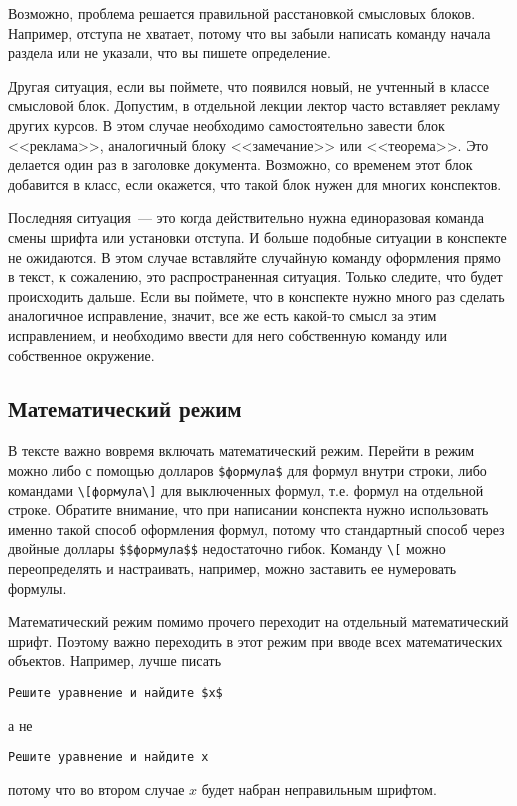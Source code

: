 \documentclass{article}
\begin{document}
    Возможно, проблема решается правильной расстановкой смысловых блоков. Например, отступа
    не хватает, потому что вы забыли написать команду начала раздела или не указали, что
    вы пишете определение.

    Другая ситуация, если вы поймете, что появился новый, не учтенный в классе смысловой блок.
    Допустим, в отдельной лекции лектор часто вставляет рекламу других курсов. В этом случае
    необходимо самостоятельно завести блок <<реклама>>, аналогичный блоку <<замечание>>
    или <<теорема>>. Это делается один раз в заголовке документа. Возможно, со временем
    этот блок добавится в класс, если окажется, что такой блок нужен для многих конспектов.

    Последняя ситуация~--- это когда действительно нужна единоразовая команда смены шрифта
    или установки отступа. И больше подобные ситуации в конспекте не ожидаются. В этом случае
    вставляйте случайную команду оформления прямо в текст, к сожалению, это
    распространенная ситуация. Только следите, что будет происходить дальше. Если вы поймете, что
    в конспекте нужно много раз сделать аналогичное исправление, значит, все же
    есть какой-то смысл за этим исправлением, и необходимо ввести для него
    собственную команду или собственное окружение.

    \subsection{Математический режим}
    В тексте важно вовремя включать математический режим. Перейти в режим можно либо с помощью долларов \verb|$формула$| для формул внутри строки, либо командами \verb|\[формула\]| для выключенных формул, т.е. формул на отдельной строке.
    Обратите внимание, что при написании конспекта нужно использовать именно такой способ оформления формул, потому что стандартный способ через двойные доллары \verb|$$формула$$| недостаточно гибок.
    Команду \verb|\[| можно переопределять и настраивать, например, можно заставить ее нумеровать формулы.

    Математический режим помимо прочего переходит на отдельный математический шрифт.
    Поэтому важно переходить в этот режим при вводе всех математических объектов.
    Например, лучше писать \begin{verbatim}Решите уравнение и найдите $x$\end{verbatim} а не \begin{verbatim}Решите уравнение и найдите x\end{verbatim} потому что во втором случае $x$ будет набран неправильным шрифтом.
\end{document}

